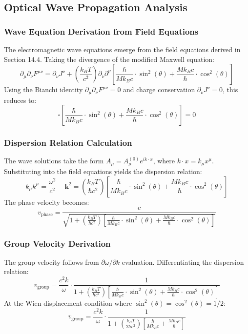 ﻿\documentclass[12pt]{article}
\begin{document}
\subsection{Optical Wave Propagation Analysis}

\subsubsection{Wave Equation Derivation from Field Equations}
The electromagnetic wave equations emerge from the field equations derived in Section 14.4. Taking the divergence of the modified Maxwell equation:
$$\partial_\mu\partial_\nu F^{\mu\nu} = \partial_\nu J^\nu + \left(\frac{k_B T}{c^2}\right)\partial_\nu\partial^\nu\left[\frac{\hbar}{Mk_Bc}\cdot\sin^2(\theta) + \frac{Mk_Bc}{\hbar}\cdot\cos^2(\theta)\right]$$
Using the Bianchi identity $\partial_\mu\partial_\nu F^{\mu\nu} = 0$ and charge conservation $\partial_\nu J^\nu = 0$, this reduces to:
$$\square\left[\frac{\hbar}{Mk_Bc}\cdot\sin^2(\theta) + \frac{Mk_Bc}{\hbar}\cdot\cos^2(\theta)\right] = 0$$

\subsubsection{Dispersion Relation Calculation}
The wave solutions take the form $A_\mu = A_\mu^{(0)}e^{ik\cdot x}$, where $k\cdot x = k_\mu x^\mu$. Substituting into the field equations yields the dispersion relation:
$$k_\mu k^\mu = \frac{\omega^2}{c^2} - \mathbf{k}^2 = \left(\frac{k_B T}{\hbar c^2}\right)\left[\frac{\hbar}{Mk_Bc}\cdot\sin^2(\theta) + \frac{Mk_Bc}{\hbar}\cdot\cos^2(\theta)\right]$$
The phase velocity becomes:
$$v_{\text{phase}} = \frac{c}{\sqrt{1 + \left(\frac{k_B T}{\hbar c^2}\right)\left[\frac{\hbar}{Mk_Bc}\cdot\sin^2(\theta) + \frac{Mk_Bc}{\hbar}\cdot\cos^2(\theta)\right]}}$$

\subsubsection{Group Velocity Derivation}
The group velocity follows from $\partial\omega/\partial k$ evaluation. Differentiating the dispersion relation:
$$v_{\text{group}} = \frac{c^2 k}{\omega} \cdot \frac{1}{1 + \left(\frac{k_B T}{\hbar c^2}\right)\left[\frac{\hbar}{Mk_Bc}\cdot\sin^2(\theta) + \frac{Mk_Bc}{\hbar}\cdot\cos^2(\theta)\right]}$$
At the Wien displacement condition where $\sin^2(\theta) = \cos^2(\theta) = 1/2$:
$$v_{\text{group}} = \frac{c^2 k}{\omega} \cdot \frac{1}{1 + \left(\frac{k_B T}{2\hbar c^2}\right)\left[\frac{\hbar}{Mk_Bc} + \frac{Mk_Bc}{\hbar}\right]}$$
\end{document}
